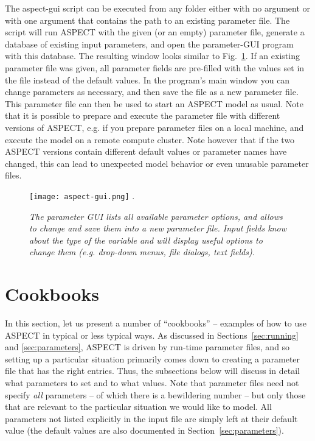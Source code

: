\documentclass{article}
\newcommand{\aspect}{\textsc{ASPECT}}
\begin{document}
The aspect-gui script can be executed from any folder either with no argument or with one argument that contains the path to
an existing parameter file. The script will run \aspect{} with the given (or an empty) parameter file, generate a database
of existing input parameters, and open the parameter-GUI program with this database. The resulting window looks similar to Fig.~\ref{fig:aspect-gui}. If an existing parameter file was
given, all parameter fields are pre-filled with the values set in the file instead of the default values.
In the program's main window you can change parameters as necessary, and then save the file as a new parameter file. This parameter file can then be used
to start an \aspect{} model as usual. Note that it is possible to prepare and execute the parameter file with different versions of \aspect{}, e.g. if you prepare parameter files on a local machine, and execute the model on a remote compute cluster.
Note however that if the two \aspect{} versions contain different default values or parameter names have changed, this can lead
to unexpected model behavior or even unusable parameter files.

\begin{figure}
\hfill
\texttt{[image: aspect-gui.png]}
\hfill
\phantom.
\caption{\it The parameter GUI lists all available parameter options, and allows to change and save them into a new parameter file. Input fields know about the type of the variable and will display useful options to change them (e.g. drop-down menus, file dialogs, text fields).}
\label{fig:aspect-gui}
\end{figure}

\section{Cookbooks}
\label{sec:cookbooks}

In this section, let us present a number of ``cookbooks'' -- examples of how
to use \aspect{} in typical or less typical ways. As discussed in
Sections~\ref{sec:running} and \ref{sec:parameters}, \aspect{} is driven by
run-time parameter files, and so setting up a particular situation primarily
comes down to creating a parameter file that has the right entries. Thus, the
subsections below will discuss in detail what parameters to set and to what
values. Note that parameter files need not specify \textit{all} parameters --
of which there is a bewildering number -- but only those that are relevant to
the particular situation we would like to model. All parameters not listed
explicitly in the input file are simply left at their default value (the
default values are also documented in Section~\ref{sec:parameters}).
\end{document}
